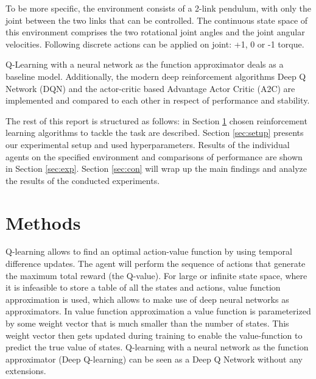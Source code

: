 \documentclass[11pt,a4paper]{article}
\begin{document}
To be more specific, the environment consists of a 2-link pendulum, with only the joint between the two links that can be controlled. The continuous state space of this environment comprises the two rotational joint angles and the joint angular velocities. Following discrete actions can be applied on joint: +1, 0 or -1 torque. 

Q-Learning with a neural network as the function approximator deals as a baseline model. Additionally, the modern deep reinforcement algorithms Deep Q Network (DQN) and the actor-critic based Advantage Actor Critic (A2C) are implemented and compared to each other in respect of performance and stability. %

The rest of this report is structured as follows: in Section \ref{sec:methods} chosen reinforcement learning algorithms to tackle the task are described. Section \ref{sec:setup} presents our experimental setup and used hyperparameters. Results of the individual agents on the specified environment and comparisons of performance are shown in Section \ref{sec:exp}. Section \ref{sec:con} will wrap up the main findings and analyze the results of the conducted experiments.


\section{Methods}
\label{sec:methods}

Q-learning allows to find an optimal action-value function by using temporal difference updates. The agent will perform the sequence of actions that generate the maximum total reward (the Q-value). For large or infinite state space, where it is infeasible to store a table of all the states and actions, value function approximation is used, which allows to make use of deep neural networks as approximators. In value function approximation a value function is parameterized by some weight vector that is much smaller than the number of states. This weight vector then gets updated during training to enable the value-function to predict the true value of states. Q-learning with a neural network as the function approximator (Deep Q-learning) can be seen as a Deep Q Network without any extensions.\\
\end{document}
